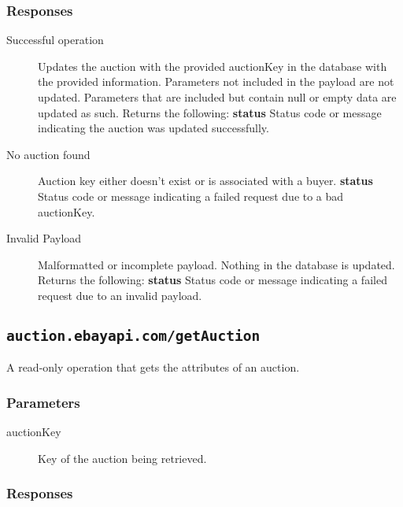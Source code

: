 \documentclass{article}
\newcommand{\code}[1]{\colorbox{light-gray}{\texttt{#1}}}
\begin{document}
\subsubsection{Responses}

\begin{description}
    \item[Successful operation] Updates the auction with the provided
        auctionKey in the database with the provided information. Parameters
        not included in the payload are not updated. Parameters that are
        included but contain null or empty data are updated as such.
        Returns the following:
        \subitem\textbf{status} Status code or message indicating the auction was updated successfully.

    \item[No auction found] Auction key either doesn't exist or is associated
        with a buyer.
        \subitem\textbf{status} Status code or message indicating a failed
        request due to a bad auctionKey.

    \item[Invalid Payload] Malformatted or incomplete payload. Nothing
        in the database is updated. Returns the following:
        \subitem\textbf{status} Status code or message indicating a failed
        request due to an invalid payload.
\end{description}

\subsection{\code{auction.ebayapi.com/getAuction}}
A read-only operation that gets the attributes of an auction.

\subsubsection{Parameters}

\begin{description}
    \item[auctionKey] Key of the auction being retrieved.
\end{description}

\subsubsection{Responses}
\end{document}
